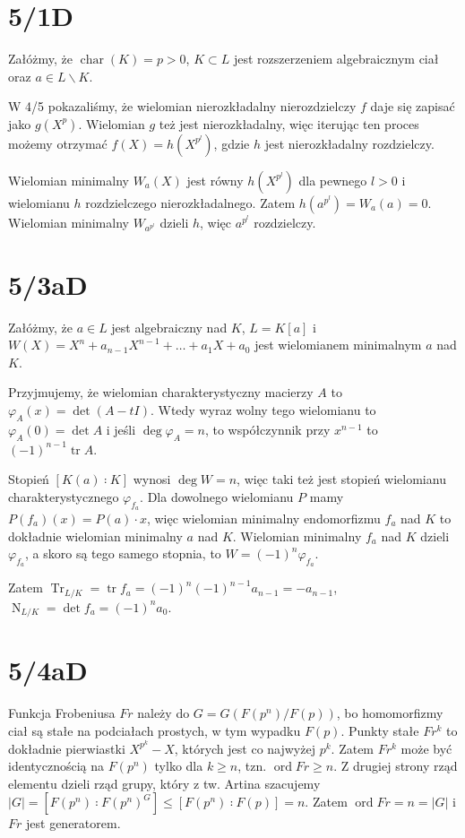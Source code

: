 \documentclass[a4paper, 12pt]{article}
\title{}
\author{Wiktor Kuchta}
\date{\vspace{-4ex}}
\DeclareMathOperator{\Norm}{N}
\DeclareMathOperator{\Char}{char}
\DeclareMathOperator{\ord}{ord}
\DeclareMathOperator{\tr}{tr}
\DeclareMathOperator{\Tr}{Tr}
\newcommand{\+}{\enspace}
\begin{document}
\maketitle

\section*{5/1D}
Załóżmy, że $\Char(K) = p > 0$, $K ⊂ L$ jest rozszerzeniem algebraicznym ciał
oraz $a∈L∖K$.

W 4/5 pokazaliśmy, że
wielomian nierozkładalny nierozdzielczy $f$ daje się
zapisać jako $g(X^p)$.
Wielomian $g$ też jest nierozkładalny, więc iterując ten proces
możemy otrzymać $f(X) = h(X^{p^l})$,
gdzie $h$ jest nierozkładalny rozdzielczy.

Wielomian minimalny $W_a(X)$ jest równy $h(X^{p^l})$ dla pewnego
$l>0$ i wielomianu $h$ rozdzielczego nierozkładalnego.
Zatem $h(a^{p^l}) = W_a(a) = 0$.
Wielomian minimalny $W_{a^{p^l}}$ dzieli $h$, więc $a^{p^l}$ rozdzielczy.

\section*{5/3aD}
Załóżmy, że $a ∈ L$ jest algebraiczny nad $K$, $L = K[a]$ i
$W(X) = X^n + a_{n-1} X^{n-1} + … + a_1X + a_0$
jest wielomianem minimalnym $a$ nad $K$.

Przyjmujemy, że wielomian charakterystyczny
macierzy $A$ to $φ_A(x) = \det (A - tI)$.
Wtedy wyraz wolny tego wielomianu to $φ_A(0) = \det A$
i jeśli $\deg φ_A = n$, to
współczynnik przy $x^{n-1}$ to $(-1)^{n-1} \tr A$.

Stopień $[K(a) ∶ K]$ wynosi $\deg W = n$,
więc taki też jest stopień wielomianu charakterystycznego $φ_{f_a}$.
Dla dowolnego wielomianu $P$ mamy
$P(f_a)(x) = P(a)·x$,
więc wielomian minimalny endomorfizmu $f_a$ nad $K$
to dokładnie wielomian minimalny $a$ nad $K$.
Wielomian minimalny $f_a$ nad $K$ dzieli $φ_{f_a}$,
a skoro są tego samego stopnia,
to $W = (-1)^n φ_{f_a}$.

Zatem $\Tr_{L/K} = \tr f_a = (-1)^n(-1)^{n-1}a_{n-1} = -a_{n-1}$,
$\Norm_{L/K} = \det f_a = (-1)^n a_0$.


\section*{5/4aD}
Funkcja Frobeniusa $Fr$ należy do $G=G(F(p^n)/F(p))$, bo
homomorfizmy ciał są stałe na podciałach prostych, w tym wypadku $F(p)$.
Punkty stałe $Fr^k$ to dokładnie pierwiastki
$X^{p^k}-X$, których jest co najwyżej $p^k$.
Zatem $Fr^k$ może być identycznością na $F(p^n)$
tylko dla $k≥n$, tzn. $\ord Fr ≥ n$.
Z drugiej strony rząd elementu dzieli rząd grupy,
który z tw. Artina szacujemy
$|G| = [F(p^n) ∶ F(p^n)^G] ≤ [F(p^n) ∶ F(p)] = n$.
Zatem $\ord Fr = n = |G|$ i $Fr$ jest generatorem.
\end{document}

